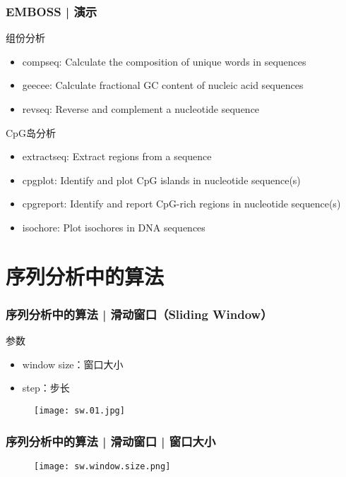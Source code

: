 \begin{frame}
  \frametitle{EMBOSS | 演示}
  \begin{block}{组份分析}
  \begin{itemize}
    \item compseq: Calculate the composition of unique words in sequences
    \item geecee: Calculate fractional GC content of nucleic acid sequences
    \item revseq: Reverse and complement a nucleotide sequence
  \end{itemize}
  \end{block}
  \begin{block}{CpG岛分析}
  \begin{itemize}
    \item extractseq: Extract regions from a sequence
    \item cpgplot: Identify and plot CpG islands in nucleotide sequence(s)
    \item cpgreport: Identify and report CpG-rich regions in nucleotide sequence(s)
    \item isochore: Plot isochores in DNA sequences
  \end{itemize}
\end{block}
\end{frame}

\section{序列分析中的算法}
\begin{frame}
  \frametitle{序列分析中的算法 | 滑动窗口（Sliding Window）}
  \begin{block}{参数}
    \begin{itemize}
      \item window size：窗口大小
      \item step：步长
    \end{itemize}
  \end{block}
  \begin{figure}
    \centering
    \texttt{[image: sw.01.jpg]}
  \end{figure}
\end{frame}

\begin{frame}
  \frametitle{序列分析中的算法 | 滑动窗口 | 窗口大小}
  \begin{figure}
    \centering
    \texttt{[image: sw.window.size.png]}
  \end{figure}
\end{frame}

